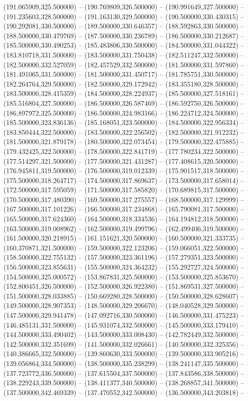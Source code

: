 (191.065909,325.500000) -- (190.769809,326.500000) -- (190.991649,327.500000) -- (191.235603,328.500000) -- (191.163130,329.500000) -- (190.500000,330.430315) -- (190.292081,330.500000) -- (189.500000,330.646357) -- (188.592863,330.500000) -- (188.500000,330.479769) -- (187.500000,330.236789) -- (186.500000,330.212687) -- (185.500000,330.490253) -- (185.483806,330.500000) -- (184.500000,331.044322) -- (183.810718,331.500000) -- (183.500000,331.750438) -- (182.511247,332.500000) -- (182.500000,332.527059) -- (182.457529,332.500000) -- (181.500000,331.597860) -- (181.491065,331.500000) -- (181.500000,331.450717) -- (181.785751,330.500000) -- (182.264764,329.500000) -- (182.500000,329.172942) -- (183.355180,328.500000) -- (183.500000,328.415359) -- (184.500000,328.224937) -- (185.500000,327.518161) -- (185.516804,327.500000) -- (186.500000,326.587469) -- (186.592750,326.500000) -- (186.897972,325.500000) -- (186.500000,324.983166) -- (186.224712,324.500000) -- (185.500000,323.836136) -- (185.168051,323.500000) -- (184.500000,322.956334) -- (183.850444,322.500000) -- (183.500000,322.256502) -- (182.500000,321.912232) -- (181.500000,321.879178) -- (180.500000,322.073454) -- (179.500000,322.475885) -- (179.432425,322.500000) -- (178.500000,322.841719) -- (177.780234,322.500000) -- (177.514297,321.500000) -- (177.500000,321.431287) -- (177.408615,320.500000) -- (176.945811,319.500000) -- (176.500000,319.012339) -- (175.901517,318.500000) -- (175.500000,318.264717) -- (174.500000,317.869637) -- (173.500000,317.658014) -- (172.500000,317.595059) -- (171.500000,317.585820) -- (170.689815,317.500000) -- (170.500000,317.480390) -- (169.500000,317.275557) -- (168.500000,317.129999) -- (167.500000,317.101226) -- (166.500000,317.234868) -- (165.790081,317.500000) -- (165.500000,317.624360) -- (164.500000,318.334536) -- (164.194812,318.500000) -- (163.500000,319.008962) -- (162.500000,319.499796) -- (162.499406,319.500000) -- (161.500000,320.218915) -- (161.151621,320.500000) -- (160.500000,321.333735) -- (160.370871,321.500000) -- (159.500000,322.123206) -- (159.066051,322.500000) -- (158.500000,322.755132) -- (157.500000,323.361196) -- (157.279351,323.500000) -- (156.500000,323.855631) -- (155.500000,324.364232) -- (155.292727,324.500000) -- (154.500000,325.000572) -- (153.867831,325.500000) -- (153.500000,325.853670) -- (152.800451,326.500000) -- (152.500000,326.922380) -- (151.869531,327.500000) -- (151.500000,328.033885) -- (150.669280,328.500000) -- (150.500000,328.628607) -- (149.500000,328.907353) -- (148.500000,329.206670) -- (148.040528,329.500000) -- (147.500000,329.941478) -- (147.092716,330.500000) -- (146.500000,331.475223) -- (146.485131,331.500000) -- (145.931074,332.500000) -- (145.500000,333.179410) -- (144.500000,333.490402) -- (143.500000,333.008430) -- (142.782449,332.500000) -- (142.500000,332.351699) -- (141.500000,332.026661) -- (140.500000,332.325356) -- (140.386665,332.500000) -- (139.860630,333.500000) -- (139.500000,333.905216) -- (139.056864,334.500000) -- (138.500000,335.238299) -- (138.241147,335.500000) -- (137.723772,336.500000) -- (137.615504,337.500000) -- (137.843586,338.500000) -- (138.229243,339.500000) -- (138.411377,340.500000) -- (138.268857,341.500000) -- (137.500000,342.469339) -- (137.470552,342.500000) -- (136.500000,343.203818) -- 